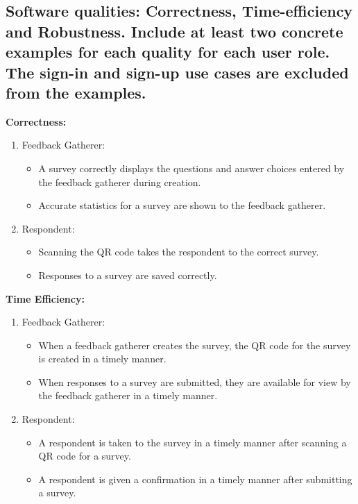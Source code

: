 \documentclass[letterpaper, 12 pt, conference]{ieeeconf}
\begin{document}
\subsection{Software qualities: Correctness, Time-eﬀiciency and Robustness. Include at least two concrete examples for each quality for each user role. The sign-in and sign-up use cases are excluded from the examples.}

\textbf{Correctness:}
\begin{enumerate}
    \item[] Feedback Gatherer:
    \begin{itemize}
        \item A survey correctly displays the questions and answer choices entered by the feedback gatherer during creation. 
        \item Accurate statistics for a survey are shown to the feedback gatherer.
    \end{itemize}
    \item[] Respondent:
    \begin{itemize}
        \item Scanning the QR code takes the respondent to the correct survey.
        \item Responses to a survey are saved correctly.
    \end{itemize}
\end{enumerate}

\textbf{Time Efficiency:}
\begin{enumerate}
    \item[] Feedback Gatherer:
    \begin{itemize}
        \item  When a feedback gatherer creates the survey, the QR code for the survey is created in a timely manner.
        \item When responses to a survey are submitted, they are available for view by the feedback gatherer in a timely manner.
    \end{itemize}
    \item[] Respondent:
    \begin{itemize}
        \item A respondent is taken to the survey in a timely manner after scanning a QR code for a survey.
        \item A respondent is given a confirmation in a timely manner after submitting a survey.
    \end{itemize}
\end{enumerate}
\end{document}
